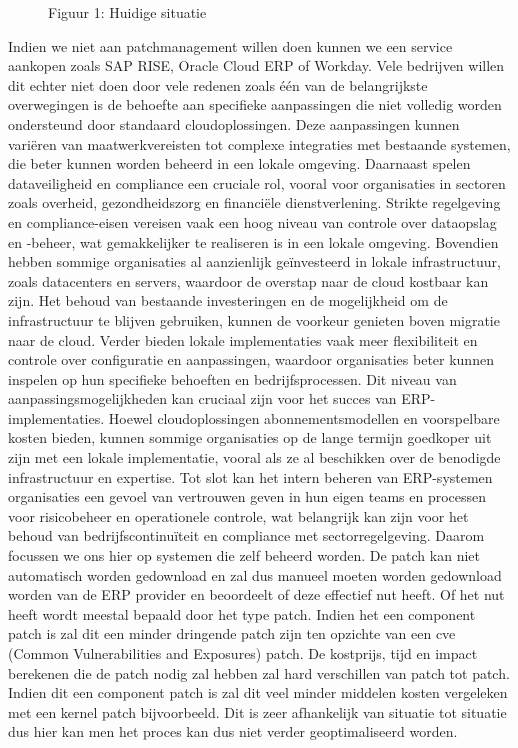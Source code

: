 \documentclass[dutch,dit,thesis]{hogentreport}
\begin{document}
\begin{figure}
    \caption{Figuur 1: Huidige situatie}
    \label{fig:huidigesituatie}
\end{figure}


Indien we niet aan patchmanagement willen doen kunnen we een service aankopen zoals SAP RISE, Oracle Cloud ERP of Workday. Vele bedrijven willen dit echter niet doen door vele
 redenen zoals één van de belangrijkste overwegingen is de behoefte aan specifieke aanpassingen die niet volledig worden ondersteund door standaard cloudoplossingen. 
 Deze aanpassingen kunnen variëren van maatwerkvereisten tot complexe integraties met bestaande systemen, die beter kunnen worden beheerd in een lokale omgeving.
Daarnaast spelen dataveiligheid en compliance een cruciale rol, vooral voor organisaties in sectoren zoals overheid, gezondheidszorg en financiële dienstverlening.
 Strikte regelgeving en compliance-eisen vereisen vaak een hoog niveau van controle over dataopslag en -beheer, wat gemakkelijker te realiseren is in een lokale omgeving.
Bovendien hebben sommige organisaties al aanzienlijk geïnvesteerd in lokale infrastructuur, zoals datacenters en servers, waardoor de overstap naar de cloud kostbaar kan zijn.
 Het behoud van bestaande investeringen en de mogelijkheid om de infrastructuur te blijven gebruiken, kunnen de voorkeur genieten boven migratie naar de cloud.
Verder bieden lokale implementaties vaak meer flexibiliteit en controle over configuratie en aanpassingen, waardoor organisaties beter kunnen inspelen op hun specifieke behoeften en 
bedrijfsprocessen. Dit niveau van aanpassingsmogelijkheden kan cruciaal zijn voor het succes van ERP-implementaties.
Hoewel cloudoplossingen abonnementsmodellen en voorspelbare kosten bieden, kunnen sommige organisaties op de lange termijn goedkoper uit zijn met een lokale implementatie, vooral als
 ze al beschikken over de benodigde infrastructuur en expertise.
Tot slot kan het intern beheren van ERP-systemen organisaties een gevoel van vertrouwen geven in hun eigen teams en processen voor risicobeheer en operationele controle, wat belangrijk 
kan zijn voor het behoud van bedrijfscontinuïteit en compliance met sectorregelgeving. Daarom focussen we ons hier op systemen die zelf beheerd worden. 
De patch kan niet automatisch worden gedownload en zal dus manueel moeten worden gedownload worden van de ERP provider en beoordeelt of deze effectief nut heeft. Of het nut heeft wordt
 meestal bepaald door het type patch. Indien het een component patch is zal dit een minder dringende patch zijn ten opzichte van een cve (Common Vulnerabilities and Exposures) patch. De
  kostprijs, tijd en impact berekenen die de patch nodig zal hebben zal hard verschillen van patch tot patch. Indien dit een component patch is zal dit veel minder middelen kosten vergeleken
   met een kernel patch bijvoorbeeld. Dit is zeer afhankelijk van situatie tot situatie dus hier kan men het proces kan dus niet verder geoptimaliseerd worden.
\end{document}
